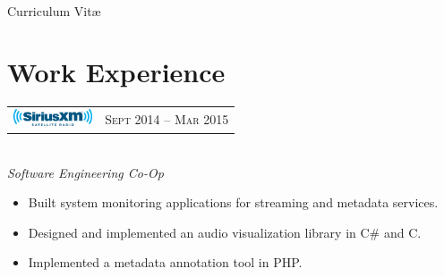 \documentclass[10pt]{article}
\begin{document}
\color{text1} %




\par{\\ %
{\color{headings} Curriculum {Vit\ae}\\[15pt]\par}
	

\begin{minipage}[t]{0.5\textwidth} %
\vspace{0pt} %
	

\section{Work Experience} 


\begin{tabular}{ L{5cm} R{3.5cm} }
\includegraphics[height=0.5cm]{siriusxm} & 
{\raggedleft\textsc{Sept 2014 -- Mar 2015}} \\
\end{tabular}
{\raggedright\large \\
\textit{Software Engineering Co-Op}\\[5pt]}

\begin{itemize}
  \item[\ding{226}] Built system monitoring applications for streaming and metadata services.
  \item[\ding{226}] Designed and implemented an audio visualization library in C\# and C.
  \item[\ding{226}] Implemented a metadata annotation tool in PHP.
\end{itemize}


\end{minipage}}
\end{document}
